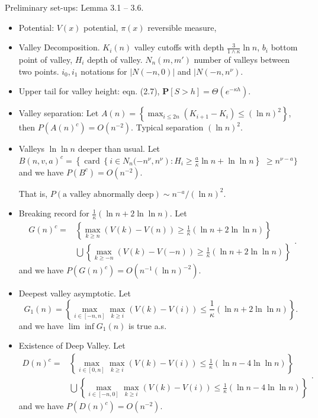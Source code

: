 Preliminary set-ups:
Lemma 3.1 -- 3.6.
\begin{itemize}
	\item Potential: $V(x)$ potential, $\pi(x)$ reversible measure, 	
	\item Valley Decomposition. $K_i(n)$ valley cutoffs with depth $\frac{3}{1 \wedge \kappa}\ln n$, $b_i$ bottom point of valley, $H_i$ depth of valley. $N_n(m, m')$ number of valleys between two points. $i_0, i_1$ notations for $|N(-n, 0)|$ and $|N(-n, n^\nu)$.
	\item Upper tail for valley height: eqn. (2.7), $\mathbf{P}[S>h]=\Theta\left(e^{-\kappa h}\right)$.
	\item Valley separation: Let $A(n)=\left\{\max _{i \leq 2 n}\left(K_{i+1}-K_i\right) \leq(\ln n)^2\right\}$, then $P(A(n)^c) = O(n^{-2})$. Typical separation $(\ln n)^2$.
	\item Valleys $\ln \ln n$ deeper than usual. Let $B(n, v, a)^c=\left\{\operatorname{card}\left\{i \in N_n(-n^\nu, n^\nu\right): H_i \geq \frac{a}{\kappa} \ln n+\ln \ln n\right\}$ $ \geq n^{\nu-a}\}$ and we have $P(B^c) = O(n^{-2})$.


		That is, $P(\text{a valley abnormally deep}) \sim n^{- a} / (\ln n)^2$.

	\item Breaking record for $\frac{1}{\kappa}(\ln n+2 \ln \ln n)$. Let 
		\[
			\begin{aligned}
G(n)^c= & \left\{\max _{k \geq n}(V(k)-V(n)) \geq \frac{1}{\kappa}(\ln n+2 \ln \ln n)\right\} \\
& \bigcup\left\{\max _{k \geq-n}(V(k)-V(-n)) \geq \frac{1}{\kappa}(\ln n+2 \ln \ln n)\right\}
\end{aligned}
		.\] 
		and we have $P(G(n)^c) = O(n^{-1} (\ln n)^{-2})$.
	\item Deepest valley asymptotic. Let
		\[
			G_1(n)=\left\{\max _{i \in[-n, n]} \max _{k \geq i}(V(k)-V(i)) \leq \frac{1}{\kappa}(\ln n+2 \ln \ln n)\right\}
		.\] 
		and we have $\lim \inf G_1(n)$ is true a.s.

	\item Existence of Deep Valley. Let
		\[
			\begin{aligned}
D(n)^c= & \left\{\max _{i \in[0, n]} \max _{k \geq i}(V(k)-V(i)) \leq \frac{1}{\kappa}(\ln n-4 \ln \ln n)\right\} \\
& \bigcup\left\{\max _{i \in[-n, 0]} \max _{k \geq i}(V(k)-V(i)) \leq \frac{1}{\kappa}(\ln n-4 \ln \ln n)\right\}
\end{aligned}
		.\]
		and we have $P(D(n)^c) = O(n^{-2})$.


\end{itemize}

